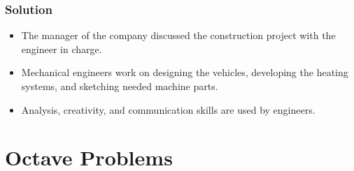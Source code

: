 \documentclass[a4paper, 10pt]{article}
\begin{document}
			\subsubsection{Solution}
				\begin{itemize}
					\item The manager of the company discussed the construction project with the engineer in charge.
					\item Mechanical engineers work on designing the vehicles, developing the heating systems, and sketching needed machine parts.
					\item Analysis, creativity, and communication skills are used by engineers.
				\end{itemize}
	\section{Octave Problems}
\end{document}
